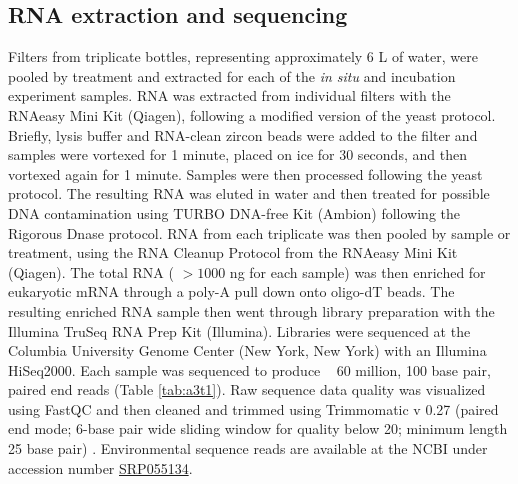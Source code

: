 \subsection{RNA extraction and sequencing}
Filters from triplicate bottles, representing approximately 6 L of water, were pooled by treatment and extracted for each of the \textit{in situ} and incubation experiment samples. RNA was extracted from individual filters with the RNAeasy Mini Kit (Qiagen), following a modified version of the yeast protocol. Briefly, lysis buffer and RNA-clean zircon beads were added to the filter and samples were vortexed for 1 minute, placed on ice for 30 seconds, and then vortexed again for 1 minute. Samples were then processed following the yeast protocol. The resulting RNA was eluted in water and then treated for possible DNA contamination using TURBO DNA-free Kit (Ambion) following the Rigorous Dnase protocol. RNA from each triplicate was then pooled by sample or treatment, using the RNA Cleanup Protocol from the RNAeasy Mini Kit (Qiagen). The total RNA ( $>1000$ ng for each sample) was then enriched for eukaryotic mRNA through a poly-A pull down onto oligo-dT beads. The resulting enriched RNA sample then went through library preparation with the Illumina TruSeq RNA Prep Kit (Illumina). Libraries were sequenced at the Columbia University Genome Center (New York, New York) with an Illumina HiSeq2000. Each sample was sequenced to produce ~ 60 million, 100 base pair, paired end reads (Table \ref{tab:a3t1}). Raw sequence data quality was visualized using FastQC \citep{Andrewsa} and then cleaned and trimmed using Trimmomatic v 0.27 (paired end mode; 6-base pair wide sliding window for quality below 20; minimum length 25 base pair) \citep{Lohse2012}. Environmental sequence reads are available at the NCBI under accession number \href{http://www.ncbi.nlm.nih.gov/sra/?term=SRP055134}{SRP055134}. 

